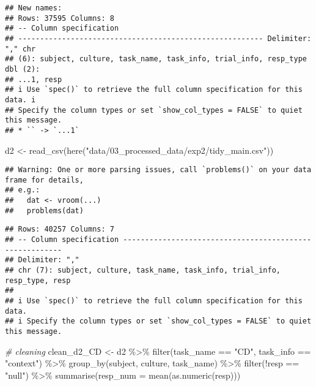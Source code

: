 \documentclass[
]{article}
\newenvironment{Shaded}{\begin{snugshade}}{\end{snugshade}}
\newcommand{\AttributeTok}[1]{\textcolor[rgb]{0.77,0.63,0.00}{#1}}
\newcommand{\CommentTok}[1]{\textcolor[rgb]{0.56,0.35,0.01}{\textit{#1}}}
\newcommand{\FunctionTok}[1]{\textcolor[rgb]{0.00,0.00,0.00}{#1}}
\newcommand{\NormalTok}[1]{#1}
\newcommand{\OtherTok}[1]{\textcolor[rgb]{0.56,0.35,0.01}{#1}}
\newcommand{\SpecialCharTok}[1]{\textcolor[rgb]{0.00,0.00,0.00}{#1}}
\newcommand{\StringTok}[1]{\textcolor[rgb]{0.31,0.60,0.02}{#1}}
\begin{document}
\begin{verbatim}
## New names:
## Rows: 37595 Columns: 8
## -- Column specification
## -------------------------------------------------------- Delimiter: "," chr
## (6): subject, culture, task_name, task_info, trial_info, resp_type dbl (2):
## ...1, resp
## i Use `spec()` to retrieve the full column specification for this data. i
## Specify the column types or set `show_col_types = FALSE` to quiet this message.
## * `` -> `...1`
\end{verbatim}

\begin{Shaded}
\begin{Highlighting}[]
\NormalTok{d2 }\OtherTok{\textless{}{-}} \FunctionTok{read\_csv}\NormalTok{(}\FunctionTok{here}\NormalTok{(}\StringTok{"data/03\_processed\_data/exp2/tidy\_main.csv"}\NormalTok{))}
\end{Highlighting}
\end{Shaded}

\begin{verbatim}
## Warning: One or more parsing issues, call `problems()` on your data frame for details,
## e.g.:
##   dat <- vroom(...)
##   problems(dat)
\end{verbatim}

\begin{verbatim}
## Rows: 40257 Columns: 7
## -- Column specification --------------------------------------------------------
## Delimiter: ","
## chr (7): subject, culture, task_name, task_info, trial_info, resp_type, resp
## 
## i Use `spec()` to retrieve the full column specification for this data.
## i Specify the column types or set `show_col_types = FALSE` to quiet this message.
\end{verbatim}

\begin{Shaded}
\begin{Highlighting}[]
\CommentTok{\# cleaning }
\NormalTok{clean\_d2\_CD }\OtherTok{\textless{}{-}}\NormalTok{ d2 }\SpecialCharTok{\%\textgreater{}\%} 
  \FunctionTok{filter}\NormalTok{(task\_name }\SpecialCharTok{==} \StringTok{"CD"}\NormalTok{, task\_info }\SpecialCharTok{==} \StringTok{"context"}\NormalTok{) }\SpecialCharTok{\%\textgreater{}\%} 
  \FunctionTok{group\_by}\NormalTok{(subject, culture, task\_name) }\SpecialCharTok{\%\textgreater{}\%} 
  \FunctionTok{filter}\NormalTok{(}\SpecialCharTok{!}\NormalTok{resp }\SpecialCharTok{==} \StringTok{"null"}\NormalTok{) }\SpecialCharTok{\%\textgreater{}\%} 
  \FunctionTok{summarise}\NormalTok{(}\AttributeTok{resp\_num =} \FunctionTok{mean}\NormalTok{(}\FunctionTok{as.numeric}\NormalTok{(resp)))}
\end{Highlighting}
\end{Shaded}
\end{document}
